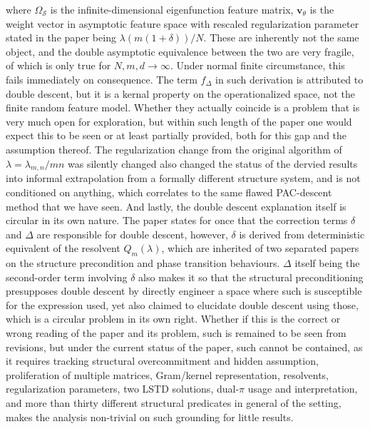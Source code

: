 where $\Omega_{\mathcal{S}}$ is the infinite-dimensional eigenfunction feature matrix, $\bm{v}_{\theta}$ is the weight vector in asymptotic feature space with rescaled regularization parameter stated in the paper being $\lambda(m(1+\delta))/N$. These are inherently not the same object, and the double asymptotic equivalence between the two are very fragile, of which is only true for $N,m,d\to \infty$. Under normal finite circumstance, this fails immediately on consequence. The term $f_{\Delta}$ in such derivation is attributed to double descent, but it is a kernal property on the operationalized space, not the finite random feature model. Whether they actually coincide is a problem that is very much open for exploration, but within such length of the paper one would expect this to be seen or at least partially provided, both for this gap and the assumption thereof. The regularization change from the original algorithm of $\lambda = \lambda_{m,n}/mn$ was silently changed also changed the status of the dervied results into informal extrapolation from a formally different structure system, and is not conditioned on anything, which correlates to the same flawed PAC-descent method that we have seen. And lastly, the double descent explanation itself is circular in its own nature. The paper states for once that the correction terms $\delta$ and $\Delta$ are responsible for double descent, however, $\delta$ is derived from deterministic equivalent of the resolvent $Q_{m}(\lambda)$, which are inherited of two separated papers on the structure precondition and phase transition behaviours. $\Delta$ itself being the second-order term involving $\delta$ also makes it so that the structural preconditioning presupposes double descent by directly engineer a space where such is susceptible for the expression used, yet also claimed to elucidate double descent using those, which is a circular problem in its own right. Whether if this is the correct or wrong reading of the paper and its problem, such is remained to be seen from revisions, but under the current status of the paper, such cannot be contained, as it requires tracking structural overcommitment and hidden assumption, proliferation of multiple matrices, Gram/kernel representation, resolvents, regularization parameters, two LSTD solutions, dual-$\pi$ usage and interpretation, and more than thirty different structural predicates in general of the setting, makes the analysis non-trivial on such grounding for little results. 



